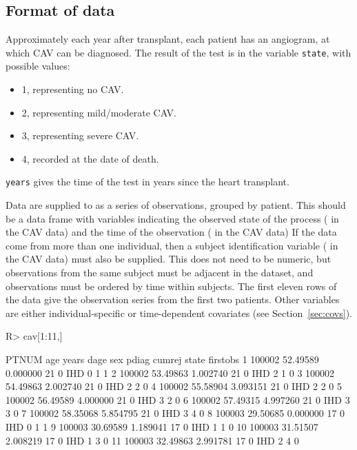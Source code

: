 \documentclass[article,shortnames]{jss}
\newcommand{\Robject}[1]{{\texttt{#1}}}
\begin{document}

\subsection{Format of data}

Approximately each year after transplant, each patient has an
angiogram, at which CAV can be diagnosed. The result of the test is in
the variable \Robject{state}, with possible values:
\begin{itemize}
\item 1, representing no CAV.
\item 2, representing mild/moderate CAV.
\item 3, representing severe CAV.
\item 4, recorded at the date of death.
\end{itemize}
\Robject{years} gives the time of the test in years since the heart
transplant.

Data are supplied to  as a series of observations, grouped by
patient. This should be a data frame with variables indicating the
observed state of the process ( in the CAV data) and the
time of the observation ( in the CAV data) If the data
come from more than one individual, then a subject identification
variable ( in the CAV data) must also be supplied.  This
does not need to be numeric, but observations from the same subject
must be adjacent in the dataset, and observations must be ordered by
time within subjects.  The first eleven rows of the data 
give the observation series from the first two patients.  Other
variables are either individual-specific or time-dependent covariates
(see Section~\ref{sec:covs}).

\begin{CodeChunk}
  \begin{CodeInput}
R> cav[1:11,]
  \end{CodeInput}
  \begin{CodeOutput}
    PTNUM      age    years dage sex pdiag cumrej state firstobs
1  100002 52.49589 0.000000   21   0   IHD      0     1        1
2  100002 53.49863 1.002740   21   0   IHD      2     1        0
3  100002 54.49863 2.002740   21   0   IHD      2     2        0
4  100002 55.58904 3.093151   21   0   IHD      2     2        0
5  100002 56.49589 4.000000   21   0   IHD      3     2        0
6  100002 57.49315 4.997260   21   0   IHD      3     3        0
7  100002 58.35068 5.854795   21   0   IHD      3     4        0
8  100003 29.50685 0.000000   17   0   IHD      0     1        1
9  100003 30.69589 1.189041   17   0   IHD      1     1        0
10 100003 31.51507 2.008219   17   0   IHD      1     3        0
11 100003 32.49863 2.991781   17   0   IHD      2     4        0
  \end{CodeOutput}
\end{CodeChunk}
\end{document}
